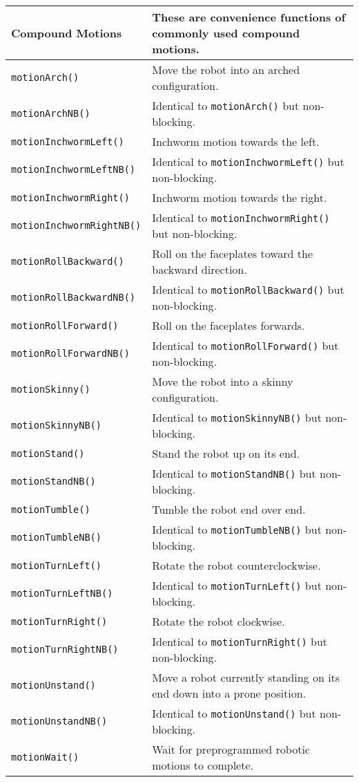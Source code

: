 \begin{tabular}{p{1.75in}p{4.5in}}
Compound Motions & These are convenience functions of commonly used compound motions. \\
\hline
\texttt{motionArch()}  & Move the robot into an arched configuration. \\
\texttt{motionArchNB()}  & Identical to \texttt{motionArch()} but non-blocking. \\
\texttt{motionInchwormLeft()}  & Inchworm motion towards the left. \\
\texttt{motionInchwormLeftNB()}  & Identical to \texttt{motionInchwormLeft()} but non-blocking. \\
\texttt{motionInchwormRight()}  & Inchworm motion towards the right. \\
\texttt{motionInchwormRightNB()}  & Identical to \texttt{motionInchwormRight()} but non-blocking. \\
\texttt{motionRollBackward()}  & Roll on the faceplates toward the backward direction. \\
\texttt{motionRollBackwardNB()}  & Identical to \texttt{motionRollBackward()} but non-blocking. \\
\texttt{motionRollForward()}  & Roll on the faceplates forwards. \\
\texttt{motionRollForwardNB()}  & Identical to \texttt{motionRollForward()} but non-blocking. \\
\texttt{motionSkinny()}  & Move the robot into a skinny configuration. \\
\texttt{motionSkinnyNB()}  & Identical to \texttt{motionSkinnyNB()} but non-blocking. \\
\texttt{motionStand()}  & Stand the robot up on its end. \\
\texttt{motionStandNB()}  & Identical to \texttt{motionStandNB()} but non-blocking. \\
\texttt{motionTumble()}  & Tumble the robot end over end. \\
\texttt{motionTumbleNB()}  & Identical to \texttt{motionTumbleNB()} but non-blocking. \\
\texttt{motionTurnLeft()}  & Rotate the robot counterclockwise. \\
\texttt{motionTurnLeftNB()}  & Identical to \texttt{motionTurnLeft()} but non-blocking. \\
\texttt{motionTurnRight()}  & Rotate the robot clockwise. \\
\texttt{motionTurnRightNB()}  & Identical to \texttt{motionTurnRight()} but non-blocking. \\
\texttt{motionUnstand()}  & Move a robot currently standing on its end down into a prone position. \\
\texttt{motionUnstandNB()}  & Identical to \texttt{motionUnstand()} but non-blocking. \\
\texttt{motionWait()}  & Wait for preprogrammed robotic motions to complete. \\
\hline
\end{tabular}
